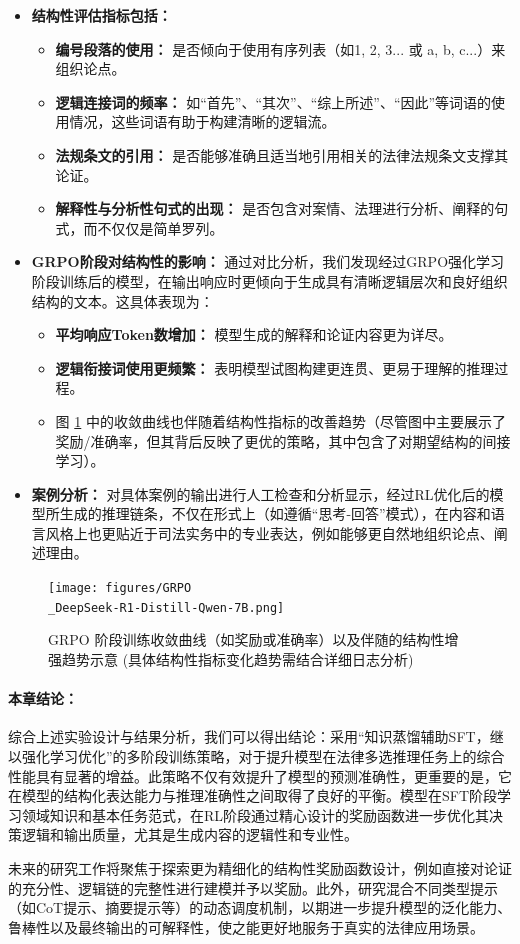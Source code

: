 \documentclass{pkuthesis}
\begin{document}
\begin{itemize}
\item \textbf{结构性评估指标包括：}
\begin{itemize}
\item \textbf{编号段落的使用：} 是否倾向于使用有序列表（如1, 2, 3... 或 a, b, c...）来组织论点。
\item \textbf{逻辑连接词的频率：} 如“首先”、“其次”、“综上所述”、“因此”等词语的使用情况，这些词语有助于构建清晰的逻辑流。
\item \textbf{法规条文的引用：} 是否能够准确且适当地引用相关的法律法规条文支撑其论证。
\item \textbf{解释性与分析性句式的出现：} 是否包含对案情、法理进行分析、阐释的句式，而不仅仅是简单罗列。
\end{itemize}
\item \textbf{GRPO阶段对结构性的影响：} 通过对比分析，我们发现经过GRPO强化学习阶段训练后的模型，在输出响应时更倾向于生成具有清晰逻辑层次和良好组织结构的文本。这具体表现为：
\begin{itemize}
\item \textbf{平均响应Token数增加：} 模型生成的解释和论证内容更为详尽。
\item \textbf{逻辑衔接词使用更频繁：} 表明模型试图构建更连贯、更易于理解的推理过程。
\item 图 \ref{fig:grpo\_distill} 中的收敛曲线也伴随着结构性指标的改善趋势（尽管图中主要展示了奖励/准确率，但其背后反映了更优的策略，其中包含了对期望结构的间接学习）。
\end{itemize}
\item \textbf{案例分析：} 对具体案例的输出进行人工检查和分析显示，经过RL优化后的模型所生成的推理链条，不仅在形式上（如遵循“思考-回答”模式），在内容和语言风格上也更贴近于司法实务中的专业表达，例如能够更自然地组织论点、阐述理由。
\end{itemize}

\begin{figure}[h]
\centering
\texttt{[image: figures/GRPO\\\_DeepSeek-R1-Distill-Qwen-7B.png]}
\caption{GRPO 阶段训练收敛曲线（如奖励或准确率）以及伴随的结构性增强趋势示意 (具体结构性指标变化趋势需结合详细日志分析)}
\label{fig:grpo\_distill}
\end{figure}

\paragraph{本章结论：}
综合上述实验设计与结果分析，我们可以得出结论：采用“知识蒸馏辅助SFT，继以强化学习优化”的多阶段训练策略，对于提升模型在法律多选推理任务上的综合性能具有显著的增益。此策略不仅有效提升了模型的预测准确性，更重要的是，它在模型的结构化表达能力与推理准确性之间取得了良好的平衡。模型在SFT阶段学习领域知识和基本任务范式，在RL阶段通过精心设计的奖励函数进一步优化其决策逻辑和输出质量，尤其是生成内容的逻辑性和专业性。

未来的研究工作将聚焦于探索更为精细化的结构性奖励函数设计，例如直接对论证的充分性、逻辑链的完整性进行建模并予以奖励。此外，研究混合不同类型提示（如CoT提示、摘要提示等）的动态调度机制，以期进一步提升模型的泛化能力、鲁棒性以及最终输出的可解释性，使之能更好地服务于真实的法律应用场景。





\printbibliography
\end{document}
